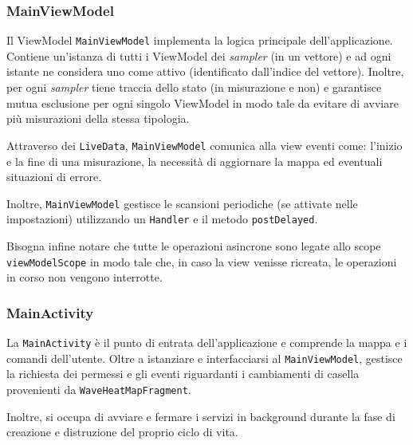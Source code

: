 \subsubsection{MainViewModel}
Il ViewModel \texttt{MainViewModel} implementa la logica principale dell'applicazione. Contiene un'istanza di tutti i ViewModel dei \textit{sampler} (in un vettore) e ad ogni istante ne considera uno come attivo (identificato dall'indice del vettore). Inoltre, per ogni \textit{sampler} tiene traccia dello stato (in misurazione e non) e garantisce mutua esclusione per ogni singolo ViewModel in modo tale da evitare di avviare più misurazioni della stessa tipologia.

Attraverso dei \texttt{LiveData}, \texttt{MainViewModel} comunica alla view eventi come: l'inizio e la fine di una misurazione, la necessità di aggiornare la mappa ed eventuali situazioni di errore.

Inoltre, \texttt{MainViewModel} gestisce le scansioni periodiche (se attivate nelle impostazioni) utilizzando un \texttt{Handler} e il metodo \texttt{postDelayed}.

Bisogna infine notare che tutte le operazioni asincrone sono legate allo scope \texttt{viewModelScope} in modo tale che, in caso la view venisse ricreata, le operazioni in corso non vengono interrotte.


\subsubsection{MainActivity}
La \texttt{MainActivity} è il punto di entrata dell'applicazione e comprende la mappa e i comandi dell'utente.
Oltre a istanziare e interfacciarsi al \texttt{MainViewModel}, gestisce la richiesta dei permessi e gli eventi riguardanti i cambiamenti di casella provenienti da \texttt{WaveHeatMapFragment}.

Inoltre, si occupa di avviare e fermare i servizi in background durante la fase di creazione e distruzione del proprio ciclo di vita.